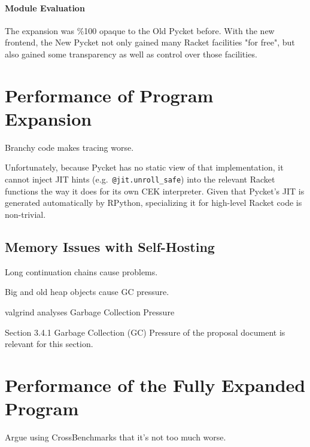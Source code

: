 		\paragraph{Module Evaluation}%
		The expansion was \%100 opaque to the Old Pycket before. With the new frontend, the New Pycket not only gained many Racket facilities "for free", but also gained some transparency as well as control over those facilities.

	\section{Performance of Program Expansion}
	\label{section:expander-performance}

		\begin{mainpoint}
			Branchy code makes tracing worse.
		\end{mainpoint}

		 Unfortunately, because Pycket has no static view of that implementation, it cannot inject JIT hints (e.g.\ \verb|@jit.unroll_safe|) into the relevant Racket functions the way it does for its own CEK interpreter.  Given that Pycket’s JIT is generated automatically by RPython, specializing it for high-level Racket code is non-trivial.

		\subsection{Memory Issues with Self-Hosting}
		\label{subsection:memory}

			\begin{mainpoint}
				Long continuation chains cause problems.

				Big and old heap objects cause GC pressure.
			\end{mainpoint}

			valgrind analyses
			Garbage Collection Pressure

			\begin{todo}[Import]
				Section 3.4.1 Garbage Collection (GC) Pressure of the proposal document is relevant for this section.
			\end{todo}

	\section{Performance of the Fully Expanded Program}
	\label{section:cross-benchmarks}

		\begin{mainpoint}
				Argue using CrossBenchmarks that it's not too much worse.
		\end{mainpoint}

